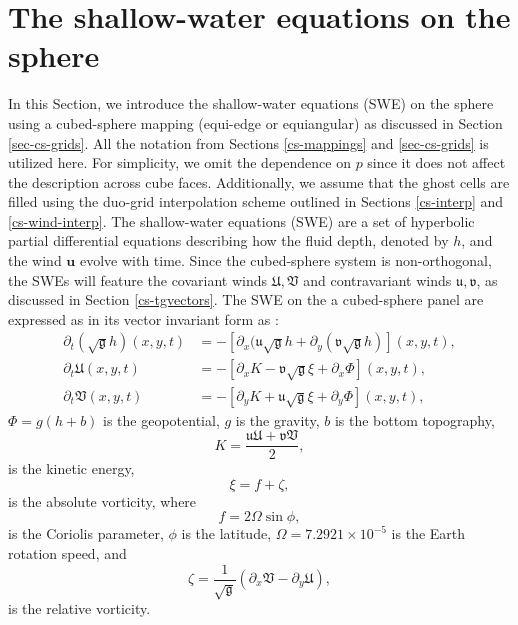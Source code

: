 \section{The shallow-water equations on the sphere}
\label{sec:sweq}
In this Section, we introduce the shallow-water equations (SWE) on the sphere using a cubed-sphere mapping 
(equi-edge or equiangular) as discussed in Section \ref{sec-cs-grids}.
All the notation from Sections \ref{cs-mappings} and \ref{sec-cs-grids} is utilized here.
For simplicity, we omit the dependence on $p$ since it does not affect the description across cube faces.
Additionally, we assume that the ghost cells are filled using the duo-grid interpolation scheme outlined in Sections \ref{cs-interp} and \ref{cs-wind-interp}.
The shallow-water equations (SWE) are a set of hyperbolic partial differential equations describing how the fluid depth, 
denoted by $h$, and the wind $\boldsymbol{u}$ evolve with time.
Since the cubed-sphere system is non-orthogonal, the SWEs will feature the covariant winds $\mathfrak{U}, \mathfrak{V}$ and
contravariant winds $\mathfrak{u}, \mathfrak{v}$, as discussed in Section \ref{cs-tgvectors}.
The SWE on the a cubed-sphere panel are expressed as in its vector invariant form as \citep{rancic:1996, nair:2005b}:
\begin{align}
	\label{2d-sweq-h}
	{\partial_t (\sqrt{\mathfrak{g}} {h})}(x, y, t) &= -
	[{\partial_x (\mathfrak{u}\sqrt{\mathfrak{g}}{h}}
	+ {\partial_y (\mathfrak{v}\sqrt{\mathfrak{g}}{h})}](x, y, t), \\
	\label{2d-sweq-u}
	{\partial_t \mathfrak{U}}(x, y, t)&=
	-[\partial_x K - \mathfrak{v}\sqrt{\mathfrak{g}}\xi +\partial_x \Phi] (x, y, t), \\
	\label{2d-sweq-v}
	{\partial_t \mathfrak{V}}(x, y, t)&=
	-[\partial_y K + \mathfrak{u}\sqrt{\mathfrak{g}}\xi + \partial_y \Phi](x, y, t), 
\end{align}
$\Phi = g(h+b)$ is the geopotential, $g$ is the gravity, $b$ is the bottom topography,
\begin{equation}
	\label{ke-eq}
	K = \frac{\mathfrak{u}\mathfrak{U}+\mathfrak{v}\mathfrak{V}}{2},
\end{equation}
is the kinetic energy,
\begin{equation}
	\label{vort-eq}
	\xi = f+ \zeta,
\end{equation}
is the absolute vorticity, where
\begin{equation}
	\label{coriolis-eq}
	f  = 2 \Omega \sin{\phi},
\end{equation}
is the Coriolis parameter,
$\phi$ is the latitude, $\Omega = 7.2921 \times 10^{-5}$ is the Earth rotation speed, and
\begin{equation}
	\label{vort2-eq}
	\zeta = \frac{1}{\sqrt{\mathfrak{g}}}(\partial_x \mathfrak{V} - \partial_y\mathfrak{U}),
\end{equation}
is the relative vorticity.

